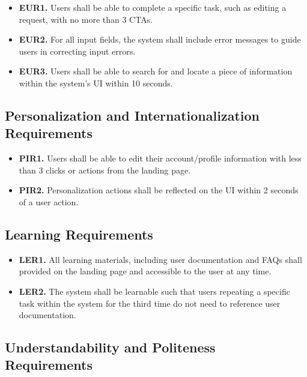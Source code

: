 \documentclass[12pt]{article}
\begin{document}
\begin{itemize}
    \item \textbf{EUR1.} Users shall be able to complete a specific task, such as editing a request, with no more than 3 CTAs.
    \item \textbf{EUR2.} For all input fields, the system shall include error messages to guide users in correcting input errors.
    \item \textbf{EUR3.} Users shall be able to search for and locate a piece of information within the system's UI within 10 seconds.
\end{itemize}

\subsection{Personalization and Internationalization Requirements}

\label{PIR}

\begin{itemize}
    \item \textbf{PIR1.} Users shall be able to edit their account/profile information with less than 3 clicks or actions from the landing page.
    \item \textbf{PIR2.} Personalization actions shall be reflected on the UI within 2 seconds of a user action.
\end{itemize}

\subsection{Learning Requirements}

\label{LER}

\begin{itemize}
    \item \textbf{LER1.} All learning materials, including user documentation and FAQs shall provided on the landing page and accessible to the user at any time.
    \item \textbf{LER2.} The system shall be learnable such that users repeating a specific task within the system for the third time do not need to reference user documentation.
\end{itemize}

\subsection{Understandability and Politeness Requirements}

\label{UAPR}
\end{document}
